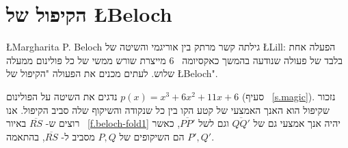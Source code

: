 
\section{%
הקיפול של
\L{\normalsize Beloch}}\label{s.beloch-fold}

\L{Margharita P. Beloch}
גילתה קשר מרתק בין אוריגמי והשיטה של
\L{Lill}:
הפעלה אחת בלבד של פעולה שנודעה בהמשך כאקסיומה%
~$6$
מייצרת שורש ממשי של כל פולינום ממעלה שלוש. לעתים מכנים את הפעולה "הקיפול של
\L{Beloch}".

נדגים את השיטה על הפולינום
$p(x)=x^3+6x^2+11x+6$
(סעיף%
~\ref{s.magic}).
נזכור שקיפול הוא האנך האמצעי של קטע הקו בין כל שנקודה והשיקוף שלה סביב הקיפול. אנו רוצים ש-%
$\overline{RS}$
באיור~%
\ref{f.beloch-fold1}
יהיה אנך אמצעי גם של
$\overline{QQ'}$
וגם לשל
$\overline{PP'}$,
כאשר 
$P',Q'$
הם השיקופים של
$P,Q$
מסביב ל-%
$\overline{RS}$,
בהתאמה.

